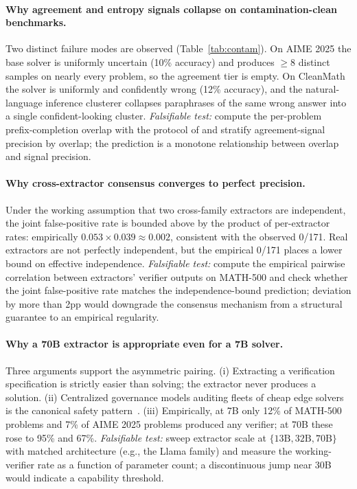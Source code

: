 \documentclass{article}
\begin{document}
\paragraph{Why agreement and entropy signals collapse on contamination-clean benchmarks.} Two distinct failure modes are observed (Table~\ref{tab:contam}). On AIME 2025 the base solver is uniformly uncertain (10\% accuracy) and produces $\geq 8$ distinct samples on nearly every problem, so the agreement tier is empty. On CleanMath the solver is uniformly and confidently wrong (12\% accuracy), and the natural-language inference clusterer collapses paraphrases of the same wrong answer into a single confident-looking cluster. \emph{Falsifiable test:} compute the per-problem prefix-completion overlap with the protocol of \citet{wu2025contam} and stratify agreement-signal precision by overlap; the prediction is a monotone relationship between overlap and signal precision.

\paragraph{Why cross-extractor consensus converges to perfect precision.} Under the working assumption that two cross-family extractors are independent, the joint false-positive rate is bounded above by the product of per-extractor rates: empirically $0.053 \times 0.039 \approx 0.002$, consistent with the observed 0/171. Real extractors are not perfectly independent, but the empirical 0/171 places a lower bound on effective independence. \emph{Falsifiable test:} compute the empirical pairwise correlation between extractors' verifier outputs on MATH-500 and check whether the joint false-positive rate matches the independence-bound prediction; deviation by more than 2pp would downgrade the consensus mechanism from a structural guarantee to an empirical regularity.

\paragraph{Why a 70B extractor is appropriate even for a 7B solver.} Three arguments support the asymmetric pairing. (i) Extracting a verification specification is strictly easier than solving; the extractor never produces a solution. (ii) Centralized governance models auditing fleets of cheap edge solvers is the canonical safety pattern~\citep{ste2024, xiong2024llmuncertainty}. (iii) Empirically, at 7B only 12\% of MATH-500 problems and 7\% of AIME 2025 problems produced any verifier; at 70B these rose to 95\% and 67\%. \emph{Falsifiable test:} sweep extractor scale at $\{13\text{B}, 32\text{B}, 70\text{B}\}$ with matched architecture (e.g., the Llama family) and measure the working-verifier rate as a function of parameter count; a discontinuous jump near 30B would indicate a capability threshold.
\end{document}
